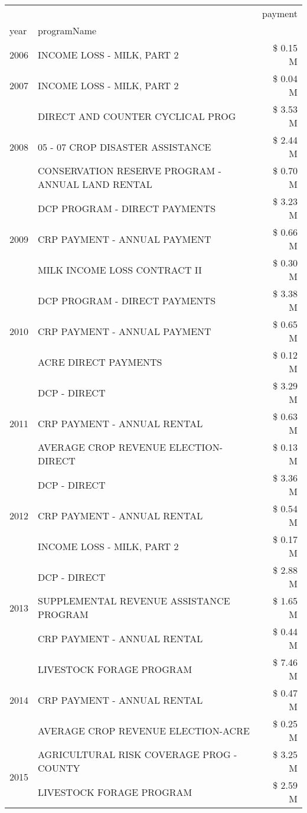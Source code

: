 \begin{tabular}{llr}
\toprule
 &  & payment \\
year & programName &  \\
\midrule
2006 & INCOME LOSS - MILK, PART 2 & \$ 0.15 M \\
\cline{1-3}
2007 & INCOME LOSS - MILK, PART 2 & \$ 0.04 M \\
\cline{1-3}
\multirow[t]{3}{*}{2008} & DIRECT AND COUNTER CYCLICAL PROG & \$ 3.53 M \\
 & 05 - 07 CROP DISASTER ASSISTANCE & \$ 2.44 M \\
 & CONSERVATION RESERVE PROGRAM - ANNUAL LAND RENTAL & \$ 0.70 M \\
\cline{1-3}
\multirow[t]{3}{*}{2009} & DCP PROGRAM - DIRECT PAYMENTS & \$ 3.23 M \\
 & CRP PAYMENT - ANNUAL PAYMENT & \$ 0.66 M \\
 & MILK INCOME LOSS CONTRACT II & \$ 0.30 M \\
\cline{1-3}
\multirow[t]{3}{*}{2010} & DCP PROGRAM - DIRECT PAYMENTS & \$ 3.38 M \\
 & CRP PAYMENT - ANNUAL PAYMENT & \$ 0.65 M \\
 & ACRE DIRECT PAYMENTS & \$ 0.12 M \\
\cline{1-3}
\multirow[t]{3}{*}{2011} & DCP - DIRECT & \$ 3.29 M \\
 & CRP PAYMENT - ANNUAL RENTAL & \$ 0.63 M \\
 & AVERAGE CROP REVENUE ELECTION-DIRECT & \$ 0.13 M \\
\cline{1-3}
\multirow[t]{3}{*}{2012} & DCP - DIRECT & \$ 3.36 M \\
 & CRP PAYMENT - ANNUAL RENTAL & \$ 0.54 M \\
 & INCOME LOSS - MILK, PART 2 & \$ 0.17 M \\
\cline{1-3}
\multirow[t]{3}{*}{2013} & DCP - DIRECT & \$ 2.88 M \\
 & SUPPLEMENTAL REVENUE ASSISTANCE PROGRAM & \$ 1.65 M \\
 & CRP PAYMENT - ANNUAL RENTAL & \$ 0.44 M \\
\cline{1-3}
\multirow[t]{3}{*}{2014} & LIVESTOCK FORAGE PROGRAM & \$ 7.46 M \\
 & CRP PAYMENT - ANNUAL RENTAL & \$ 0.47 M \\
 & AVERAGE CROP REVENUE ELECTION-ACRE & \$ 0.25 M \\
\cline{1-3}
\multirow[t]{3}{*}{2015} & AGRICULTURAL RISK COVERAGE PROG - COUNTY & \$ 3.25 M \\
 & LIVESTOCK FORAGE PROGRAM & \$ 2.59 M \\

\end{tabular}

